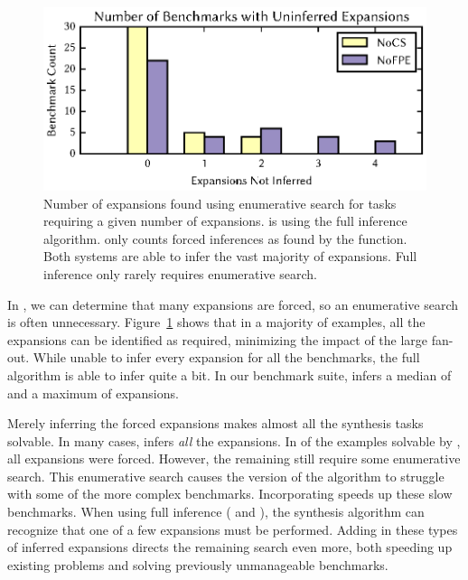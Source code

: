 \documentclass[acmsmall,screen]{acmart}
\begin{document}
\begin{figure}
  \includegraphics{generated-graphs/uninferred}
  \caption{Number of expansions found using enumerative search for tasks
    requiring a given number of
    expansions.  \NoCSMode{} is using the full inference
  algorithm.
    \NoFPEMode{} only counts forced inferences as found by
  the \ExpandRequired{} function.  Both systems are able
    to infer the vast majority of expansions. Full inference only rarely
    requires enumerative search.}
  \label{fig:uninferred-exps}
\end{figure}

In \NoFPEMode{}, we can determine that many expansions are forced, so 
an enumerative search is often unnecessary.
Figure~\ref{fig:uninferred-exps} shows that in a majority of examples, all the
expansions can be identified as required, minimizing the impact of the
large fan-out.  While unable to infer every expansion for all the benchmarks,
the full algorithm is able to infer quite a bit.
In our benchmark suite, \ExpandRequired{} infers a median of \MedianExpansionsForcedNoLC
and a maximum of \MaxExpansionsForcedNoLC expansions.

Merely inferring the forced expansions makes almost all the synthesis tasks
solvable.  In many cases, \NoFPEMode{} infers
\emph{all} the expansions.  In \ExpansionsAllForcedNoLC{} of the
\BenchmarksCompletedNoLC{} examples 
solvable by \NoCSMode{}, all expansions
were forced.  However, the remaining \ExpansionsNotAllForcedNoLC{} still require
some enumerative search.
This enumerative search causes the \NoFPEMode{} version of the algorithm to
struggle with some of the more complex benchmarks.
Incorporating \FixProblemElts{} speeds up these slow benchmarks.  When
using full inference (\FixProblemElts{} and \ExpandRequired), the synthesis
algorithm can 
recognize that one of a few expansions must be performed.  Adding in these types of
inferred expansions directs the remaining search even more, both speeding up
existing problems and solving previously unmanageable benchmarks.
\end{document}

